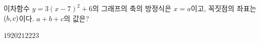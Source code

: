 이차함수 $y=3(x-7)^2+6$의 그래프의 축의 방정식은 $x=a$이고, 꼭짓점의 좌표는 $(b{,}\mkern3mu c)$이다. $a+b+c$의 값은?
\begin{choices32}{$19$}{$20$}{$21$}{$22$}{$23$}\end{choices32}
